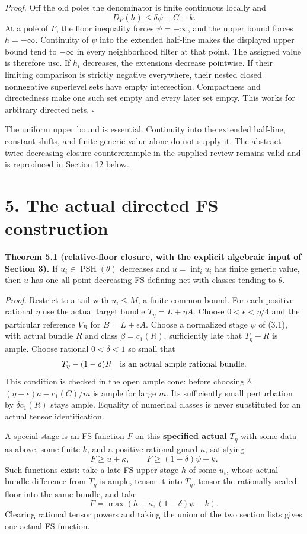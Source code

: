 \documentclass[
  10pt,
]{article}
\begin{document}
\emph{Proof.} Off the old poles the denominator is finite continuous
locally and \[D_F(h)\leq\delta\psi+C+k.\] At a pole of \(F\), the floor
inequality forces \(\psi=-\infty\), and the upper bound forces
\(h=-\infty\). Continuity of \(\psi\) into the extended half-line makes
the displayed upper bound tend to \(-\infty\) in every neighborhood
filter at that point. The assigned value is therefore usc. If \(h_i\)
decreases, the extensions decrease pointwise. If their limiting
comparison is strictly negative everywhere, their nested closed
nonnegative superlevel sets have empty intersection. Compactness and
directedness make one such set empty and every later set empty. This
works for arbitrary directed nets. \(\square\)

The uniform upper bound is essential. Continuity into the extended
half-line, constant shifts, and finite generic value alone do not supply
it. The abstract twice-decreasing-closure counterexample in the supplied
review remains valid and is reproduced in Section 12 below.

\section{5. The actual directed FS
construction}\label{the-actual-directed-fs-construction}

\textbf{Theorem 5.1 (relative-floor closure, with the explicit algebraic
input of Section 3).} If \(u_i\in\operatorname{PSH}(\theta)\) decreases
and \(u=\inf_i u_i\) has finite generic value, then \(u\) has one
all-point decreasing FS defining net with classes tending to \(\theta\).

\emph{Proof.} Restrict to a tail with \(u_i\leq M\), a finite common
bound. For each positive rational \(\eta\) use the actual target bundle
\(T_\eta=L+\eta A\). Choose \(0<\epsilon<\eta/4\) and the particular
reference \(V_B\) for \(B=L+\epsilon A\). Choose a normalized stage
\(\psi\) of (3.1), with actual bundle \(R\) and class \(\beta=c_1(R)\),
sufficiently late that \(T_\eta-R\) is ample. Choose rational
\(0<\delta<1\) so small that
\[T_\eta-(1-\delta)R\quad\hbox{is an actual ample rational bundle.}\]
This condition is checked in the open ample cone: before choosing
\(\delta\), \((\eta-\epsilon)a-c_1(C)/m\) is ample for large \(m\). Its
sufficiently small perturbation by \(\delta c_1(R)\) stays ample.
Equality of numerical classes is never substituted for an actual tensor
identification.

A special stage is an FS function \(F\) on this \textbf{specified
actual} \(T_\eta\) with some data as above, some finite \(k\), and a
positive rational guard \(\kappa\), satisfying \[F\geq u+\kappa,
\qquad F\geq(1-\delta)\psi-k.\tag{5.1}\] Such functions exist: take a
late FS upper stage \(h\) of some \(u_i\), whose actual bundle
difference from \(T_\eta\) is ample, tensor it into \(T_\eta\), tensor
the rationally scaled floor into the same bundle, and take
\[F=\max(h+\kappa,(1-\delta)\psi-k).\] Clearing rational tensor powers
and taking the union of the two section lists gives one actual FS
function.
\end{document}
